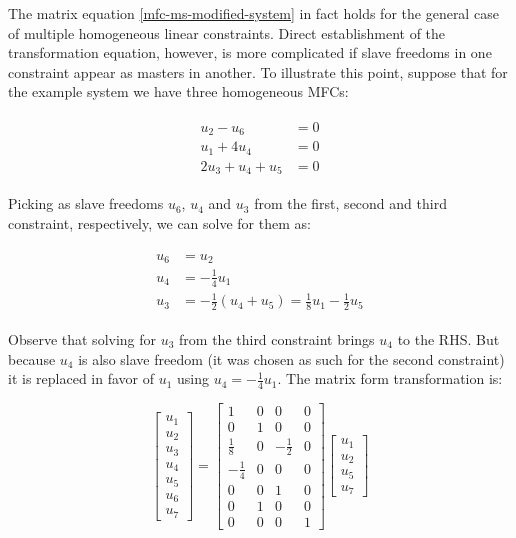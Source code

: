 \documentclass[10pt,b5paper,titlepage]{book}
\newenvironment{eqarray}
{
    \begin{eqnarray}
        \begin{aligned}
}
{
        \end{aligned}
    \end{eqnarray}
}
\begin{document}
The matrix equation \eqref{mfc-ms-modified-system} in fact holds for the general
case of multiple homogeneous linear constraints. Direct establishment of the transformation
equation, however, is more complicated if slave freedoms in one constraint appear as masters
in another. To illustrate this point, suppose that for the example system we have three
homogeneous MFCs:

\begin{eqarray}\label{mfc-ms-3-constraints}
    u_2 - u_6 &= 0 \\
    u_1 + 4 u_4 &= 0 \\
    2 u_3 + u_4 + u_5 &= 0
\end{eqarray}

Picking as slave freedoms $ u_6 $, $ u_4 $ and $ u_3 $ from the first, second and third
constraint, respectively, we can solve for them as:

\begin{eqarray}
    u_6 &= u_2 \\
    u_4 &= -\frac{1}{4} u_1 \\
    u_3 &= -\frac{1}{2} \left( u_4 + u_5 \right) = \frac{1}{8} u_1 - \frac{1}{2} u_5
\end{eqarray}

Observe that solving for $ u_3 $ from the third constraint brings $ u_4 $ to the RHS.
But because $ u_4 $ is also slave freedom (it was chosen as such for the second constraint)
it is replaced in favor of $ u_1 $ using $ u_4 = -\frac{1}{4} u_1 $. The matrix form
transformation is:

\begin{equation}\label{mfc-ms-multiple-freedoms}
    \begin{bmatrix}
        u_1 \\
        u_2 \\
        u_3 \\
        u_4 \\
        u_5 \\
        u_6 \\
        u_7
    \end{bmatrix}
    = \begin{bmatrix}
        1 & 0 & 0 & 0 \\
        0 & 1 & 0 & 0 \\
        \frac{1}{8} & 0 & -\frac{1}{2} & 0 \\
        -\frac{1}{4} & 0 & 0 & 0 \\
        0 & 0 & 1 & 0 \\
        0 & 1 & 0 & 0 \\
        0 & 0 & 0 & 1
    \end{bmatrix}
    \begin{bmatrix}
        u_1 \\
        u_2 \\
        u_5 \\
        u_7
    \end{bmatrix}
\end{equation}
\end{document}
